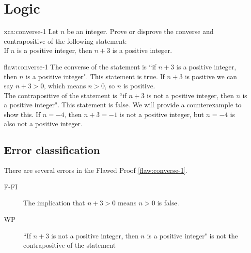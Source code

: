 \section{Logic}

\begin{xca}{xca:converse-1}
Let $n$ be an integer. Prove or disprove the converse and contrapositive of the following statement:\\

If $n$ is a positive integer, then $n + 3$ is a positive integer. 
\end{xca}

\begin{flaw}{flaw:converse-1}
The converse of the statement is ``if $n+3$ is a positive integer, then $n$ is a positive integer". This statement is true. If $n+3$ is positive we can say $n+3 > 0$, which means $n > 0$, so $n$ is positive. \\

The contrapositive of the statement is ``if $n+3$ is not a positive integer, then $n$ is a positive integer". This statement is false. We will provide a counterexample to show this. If $n = -4$, then $n+3 = -1$ is not a positive integer, but $n = -4$ is also not a positive integer. 
\end{flaw}

\clearpage
\subsection{Error classification}


There are several errors
 in the Flawed Proof \ref{flaw:converse-1}.

 \begin{description}
    \item[F-FI] The implication that $n+3 > 0$ means $n > 0$ is false. 
    \item[WP] ``If $n+3$ is not a positive integer, then $n$ is a positive integer" is not the contrapositive of the statement 
 	
 \end{description}

